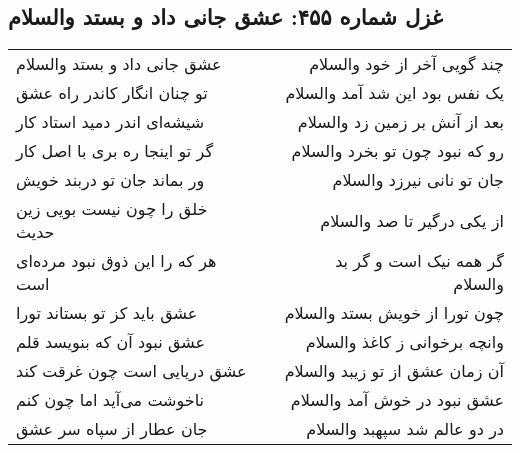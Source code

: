 \begin{center}
\section*{غزل شماره ۴۵۵: عشق جانی داد و بستد والسلام}
\label{sec:455}
\begin{longtable}{l p{0.5cm} r}
عشق جانی داد و بستد والسلام
&&
چند گویی آخر از خود والسلام
\\
تو چنان انگار کاندر راه عشق
&&
یک نفس بود این شد آمد والسلام
\\
شیشه‌ای اندر دمید استاد کار
&&
بعد از آنش بر زمین زد والسلام
\\
گر تو اینجا ره بری با اصل کار
&&
رو که نبود چون تو بخرد والسلام
\\
ور بماند جان تو دربند خویش
&&
جان تو نانی نیرزد والسلام
\\
خلق را چون نیست بویی زین حدیث
&&
از یکی درگیر تا صد والسلام
\\
هر که را این ذوق نبود مرده‌ای است
&&
گر همه نیک است و گر بد والسلام
\\
عشق باید کز تو بستاند تورا
&&
چون تورا از خویش بستد والسلام
\\
عشق نبود آن که بنویسد قلم
&&
وانچه برخوانی ز کاغذ والسلام
\\
عشق دریایی است چون غرقت کند
&&
آن زمان عشق از تو زیبد والسلام
\\
ناخوشت می‌آید اما چون کنم
&&
عشق نبود در خوش آمد والسلام
\\
جان عطار از سپاه سر عشق
&&
در دو عالم شد سپهبد والسلام
\\
\end{longtable}
\end{center}
